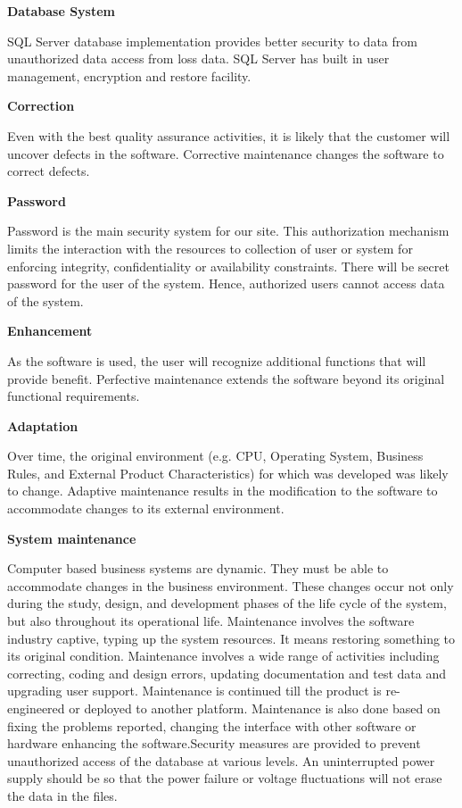 {\bf Database System }

           SQL Server database implementation provides better security to data from unauthorized data access from loss data. SQL Server has built in user management, encryption and restore facility. 


{\bf Correction}

Even with the best quality assurance activities, it is likely that the customer will uncover defects in the software. Corrective maintenance changes the software to correct defects. 

{\bf Password }

 Password is the main security system for our site. This authorization mechanism limits the interaction with the resources to collection of user or system for enforcing integrity, confidentiality or availability constraints. There will be secret password for the user of the system. Hence, authorized users cannot access data of the system.

{\bf Enhancement}

As the software is used, the user will recognize additional functions that will provide benefit. Perfective maintenance extends the software beyond its original functional requirements.


{\bf Adaptation }

Over time, the original environment (e.g. CPU, Operating System, Business Rules, and External Product Characteristics) for which was developed was likely to change. Adaptive maintenance results in the modification to the software to accommodate changes to its external environment.

{\bf System maintenance}

Computer based business systems are dynamic. They must be able to accommodate changes in the business environment. These changes occur not only during the study, design, and development phases of the life cycle of the system, but also throughout its operational life. Maintenance involves the software industry captive, typing up the system resources. It means restoring something to its original condition. Maintenance involves a wide range of activities including correcting, coding and design errors, updating documentation and test data and upgrading user support. Maintenance is continued till the product is re-engineered or deployed to another platform. Maintenance is also done based on fixing the problems reported, changing the interface with other software or hardware enhancing the software.Security measures are provided to prevent unauthorized access of the database at various levels. An uninterrupted power supply should be so that the power failure or voltage fluctuations will not erase the data in the files. 

